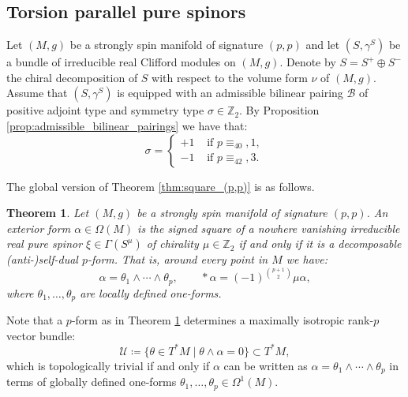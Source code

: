 \documentclass[10pt,reqno]{amsart}
\newtheorem{theorem}{Theorem}[section]
\theoremstyle{definition}
\theoremstyle{remark}
\newcommand{\Z}{\mathbb{Z}}
\begin{document}
\subsection{Torsion parallel pure spinors}

Let $(M,g)$ be a strongly spin manifold of signature $(p,p)$ and let $(S,\gamma^S)$ be a bundle of irreducible real Clifford modules on $(M,g)$. Denote by $S=S^+\oplus S^-$ the chiral decomposition of $S$ with respect to the volume form $\nu$ of $(M,g)$. Assume that $(S,\gamma^S)$ is equipped with an admissible bilinear pairing $\mathscr{B}$ of positive adjoint type and symmetry type $\sigma\in\Z_2$. By Proposition \ref{prop:admissible_bilinear_pairings} we have that: $$\sigma=\begin{cases}
    +1&\mbox{ if }p\equiv_40,1,\\
    -1&\mbox{ if }p\equiv_42,3.
\end{cases}$$

The global version of Theorem \ref{thm:square_(p,p)} is as follows.

\begin{theorem}\label{thm:global_square_(p,p)}
    Let $(M,g)$ be a strongly spin manifold of signature $(p,p)$. An exterior form $\alpha\in\Omega(M)$ is the signed square of a nowhere vanishing irreducible real pure spinor $\xi\in\Gamma(S^\mu)$ of chirality $\mu\in\Z_2$ if and only if it is a decomposable (anti-)self-dual $p$-form. That is, around every point in $M$ we have: $$\alpha=\theta_1\wedge\cdots\wedge\theta_p,\qquad *\alpha=(-1)^{\binom{p+1}{2}}\mu\alpha,$$ where $\theta_1,\ldots,\theta_p$ are locally defined one-forms.
\end{theorem}

Note that a $p$-form as in Theorem \ref{thm:global_square_(p,p)} determines a maximally isotropic rank-$p$ vector bundle: $$\mathcal{U}\coloneqq\{\theta\in T^*M\mid \theta\wedge\alpha=0\}\subset T^*M,$$ which is topologically trivial if and only if $\alpha$ can be written as $\alpha=\theta_1\wedge\cdots\wedge\theta_p$ in terms of globally defined one-forms $\theta_1,\ldots,\theta_p\in\Omega^1(M)$.\medskip
\end{document}
